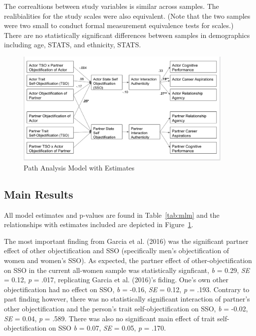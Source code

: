 \documentclass[man]{apa6}
\begin{document}
The correaltions between study variables is similar across samples. The
realibialities for the study scales were also equivalent. (Note that the
two samples were two small to conduct formal measurement equivalence
tests for scales.) There are no statistically significant differences
between samples in demographics including age, STATS, and ethnicity,
STATS.

\begin{figure}
\includegraphics[width=400px]{SEMfigure} \caption{Path Analysis Model with Estimates}\label{fig:semfigure}
\end{figure}

\subsection{Main Results}\label{main-results}

All model estimates and p-values are found in Table~\ref{tab:mlm} and
the relationships with estimates included are depicted in
Figure~\ref{fig:semfigure}.

The most important finding from Garcia et al. (2016) was the significant
partner effect of other objectification and SSO (specifically men's
objectification of women and women's SSO). As expected, the partner
effect of other-objectification on SSO in the current all-women sample
was statistically signficant, \emph{b} = 0.29, \emph{SE} = 0.12,
\emph{p} = .017, replicating Garcia et al. (2016)'s fiding. One's own
other objectification had no effect on SSO, \emph{b} = -0.16, \emph{SE}
= 0.12, \emph{p} = .193. Contrary to past finding however, there was no
statistically significant interaction of partner's other objectification
and the person's trait self-objectification on SSO, \emph{b} = -0.02,
\emph{SE} = 0.04, \emph{p} = .589. There was also no significant main
effect of trait self-objectification on SSO \emph{b} = 0.07, \emph{SE} =
0.05, \emph{p} = .170.
\end{document}
